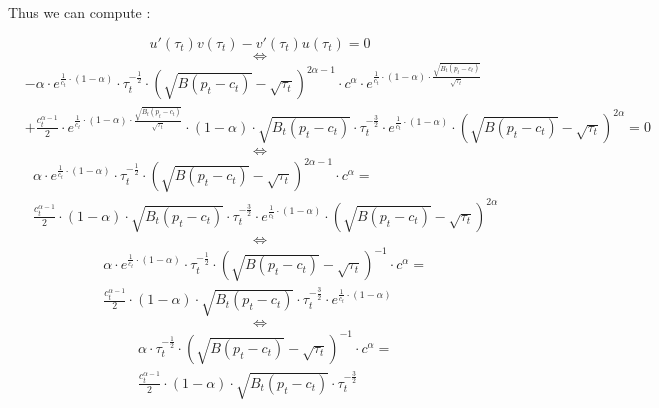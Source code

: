 \documentclass{article}
\begin{document}
Thus we can compute : 

\begin{equation*}
    u'(\tau_{t})v(\tau_{t})-v'(\tau_{t})u(\tau_{t})=0
\end{equation*}
$$\iff$$
\begin{equation*}
    \begin{split}
    & -\alpha\cdot e^{\frac{1}{c_{t}}\cdot\left(1-\alpha\right)}\cdot \tau_{t}^{-\frac{1}{2}}\cdot \left(\sqrt{B(p_{t}-c_{t})}-\sqrt{\tau_{t}}\right)^{2\alpha-1} \cdot  c^{\alpha}\cdot e^{\frac{1}{c_{t}}\cdot(1-\alpha)\cdot\frac{\sqrt{B_{t}(p_{t}-c_{t})}}{\sqrt{\tau_{t}}}} \\
    & +\frac{c_{t}^{\alpha-1}}{2}\cdot e^{\frac{1}{c_{t}}\cdot(1-\alpha)\cdot\frac{\sqrt{B_{t}(p_{t}-c_{t})}}{\sqrt{\tau_{t}}}}\cdot (1-\alpha)\cdot\sqrt{B_{t}(p_{t}-c_{t})}\cdot\tau_{t}^{-\frac{3}{2}}\cdot e^{\frac{1}{c_{t}}\cdot\left(1-\alpha\right)}\cdot\left(\sqrt{B(p_{t}-c_{t})}-\sqrt{\tau_{t}}\right)^{2\alpha}=0
    \end{split}
\end{equation*}
$$\iff$$
\begin{equation*}
    \begin{split}
    & \alpha\cdot e^{\frac{1}{c_{t}}\cdot\left(1-\alpha\right)}\cdot \tau_{t}^{-\frac{1}{2}}\cdot \left(\sqrt{B(p_{t}-c_{t})}-\sqrt{\tau_{t}}\right)^{2\alpha-1} \cdot  c^{\alpha} = \\
    & \frac{c_{t}^{\alpha-1}}{2}\cdot (1-\alpha)\cdot\sqrt{B_{t}(p_{t}-c_{t})}\cdot\tau_{t}^{-\frac{3}{2}}\cdot e^{\frac{1}{c_{t}}\cdot\left(1-\alpha\right)}\cdot\left(\sqrt{B(p_{t}-c_{t})}-\sqrt{\tau_{t}}\right)^{2\alpha}
    \end{split}
\end{equation*}
$$\iff$$
\begin{equation*}
    \begin{split}
    & \alpha\cdot e^{\frac{1}{c_{t}}\cdot\left(1-\alpha\right)}\cdot \tau_{t}^{-\frac{1}{2}}\cdot \left(\sqrt{B(p_{t}-c_{t})}-\sqrt{\tau_{t}}\right)^{-1} \cdot  c^{\alpha} = \\
    & \frac{c_{t}^{\alpha-1}}{2}\cdot (1-\alpha)\cdot\sqrt{B_{t}(p_{t}-c_{t})}\cdot\tau_{t}^{-\frac{3}{2}}\cdot e^{\frac{1}{c_{t}}\cdot\left(1-\alpha\right)}
    \end{split}
\end{equation*}
$$\iff$$
\begin{equation*}
    \begin{split}
    & \alpha\cdot \tau_{t}^{-\frac{1}{2}}\cdot \left(\sqrt{B(p_{t}-c_{t})}-\sqrt{\tau_{t}}\right)^{-1} \cdot  c^{\alpha} = \\
    & \frac{c_{t}^{\alpha-1}}{2}\cdot (1-\alpha)\cdot\sqrt{B_{t}(p_{t}-c_{t})}\cdot\tau_{t}^{-\frac{3}{2}} 
    \end{split}
\end{equation*}
\end{document}
